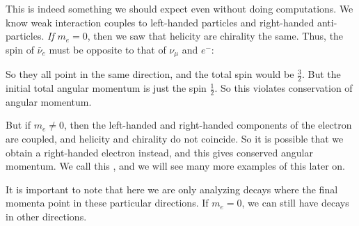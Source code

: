 \documentclass[a4paper]{article}
\begin{document}
This is indeed something we should expect even without doing computations. We know weak interaction couples to left-handed particles and right-handed anti-particles. \emph{If} $m_e = 0$, then we saw that helicity are chirality the same. Thus, the spin of $\bar{\nu}_e$ must be opposite to that of $\nu_\mu$ and $e^-$:
\begin{center}
\end{center}
So they all point in the same direction, and the total spin would be $\frac{3}{2}$. But the initial total angular momentum is just the spin $\frac{1}{2}$. So this violates conservation of angular momentum.

But if $m_e \not= 0$, then the left-handed and right-handed components of the electron are coupled, and helicity and chirality do not coincide. So it is possible that we obtain a right-handed electron instead, and this gives conserved angular momentum. We call this , and we will see many more examples of this later on.

It is important to note that here we are only analyzing decays where the final momenta point in these particular directions. If $m_e = 0$, we can still have decays in other directions.
\end{document}

